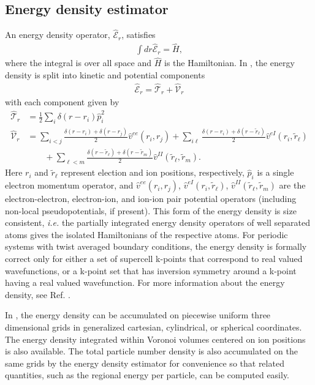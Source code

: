 \subsection{Energy density estimator}
An energy density operator, $\hat{\mathcal{E}}_r$,  satisfies
\begin{align}
  \int dr \hat{\mathcal{E}}_r = \hat{H},
\end{align}
where the integral is over all space and $\hat{H}$ is the Hamiltonian.  In \qmcpack, the energy density is split into kinetic and potential components
\begin{align}
  \hat{\mathcal{E}}_r = \hat{\mathcal{T}}_r + \hat{\mathcal{V}}_r 
\end{align}
with each component given by
\begin{align}
   \hat{\mathcal{T}}_r &=  \frac{1}{2}\sum_i\delta(r-r_i)\hat{p}_i^2 \\  
   \hat{\mathcal{V}}_r &=  \sum_{i<j}\frac{\delta(r-r_i)+\delta(r-r_j)}{2}\hat{v}^{ee}(r_i,r_j)
              + \sum_{i\ell}\frac{\delta(r-r_i)+\delta(r-\tilde{r}_\ell)}{2}\hat{v}^{eI}(r_i,\tilde{r}_\ell) \nonumber\\ 
    &\qquad   + \sum_{\ell< m}\frac{\delta(r-\tilde{r}_\ell)+\delta(r-\tilde{r}_m)}{2}\hat{v}^{II}(\tilde{r}_\ell,\tilde{r}_m).\nonumber
\end{align}
Here $r_i$ and $\tilde{r}_\ell$ represent election and ion positions, respectively, $\hat{p}_i$ is a single electron momentum operator, and $\hat{v}^{ee}(r_i,r_j)$, $\hat{v}^{eI}(r_i,\tilde{r}_\ell)$, $\hat{v}^{II}(\tilde{r}_\ell,\tilde{r}_m)$ are the electron-electron, electron-ion, and ion-ion pair potential operators (including non-local pseudopotentials, if present).  This form of the energy density is size consistent, \textit{i.e.} the partially integrated energy density operators of well separated atoms gives the isolated Hamiltonians of the respective atoms.  For periodic systems with twist averaged boundary conditions, the energy density is formally correct only for either a set of supercell k-points that correspond to real valued wavefunctions, or a k-point set that has inversion symmetry around a k-point having a real valued wavefunction.  For more information about the energy density, see Ref. \cite{Krogel2013}.

In \qmcpack, the energy density can be accumulated on piecewise uniform three dimensional grids in generalized cartesian, cylindrical, or spherical coordinates.  The energy density integrated within Voronoi volumes centered on ion positions is also available.  The total particle number density is also accumulated on the same grids by the energy density estimator for convenience so that related quantities, such as the regional energy per particle, can be computed easily.



